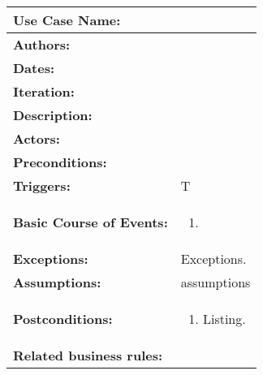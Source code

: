 \begin{tabularx}{\linewidth}{|l|X|}
\hline
\textbf{Use Case Name:} & \textbf{} \\
\hline
\textbf{Authors:} & \\
\hline
\textbf{Dates:} & \\
\hline
\textbf{Iteration:} & \\
\hline
\textbf{Description:} & \\
\hline
\textbf{Actors:} &  \\ 
\hline
\textbf{Preconditions:} & \\
\hline
\textbf{Triggers:} & T\\
\hline
\textbf{Basic Course of Events:} & 
\begin{minipage}{\linewidth} 
  \vspace{0.05em}
  \begin{enumerate}
   \item 
  \end{enumerate}
  \vspace{0.05em}
\end{minipage}
\\
\hline 
\textbf{Exceptions:} & Exceptions. \\
\hline
\textbf{Assumptions:} & assumptions \\
\hline
\textbf{Postconditions:} & 
  \begin{minipage}{\linewidth}
  \vspace{0.05em}
  \begin{enumerate}
    \item Listing.
  \end{enumerate}
  \vspace{0.05em}
\end{minipage}
\\
\hline
\textbf{Related business rules:} & \\
\hline
\end{tabularx}


